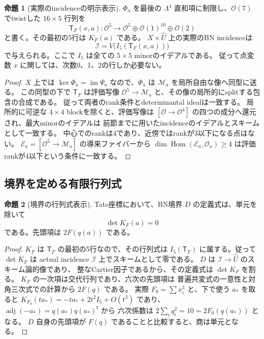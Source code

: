 \documentclass[a4paper,11pt]{ltjsarticle}
\theoremstyle{definition}
\newtheorem{theorem}{命題}[section]
\newtheorem{proposition}[theorem]{命題}
\newcommand{\OO}{\mathcal O}
\begin{document}
\begin{proposition}[実際のincidenceの明示表示]\label{prop:tate-actual-incidence}
$\Phi_a$ を最後の $\Lambda^4$ 直和項に制限し、$\OO(7)$ でtwistした
$16\times5$ 行列を
\[
 \mathsf T_F(x,a):\OO^5\longrightarrow
 \OO^5\oplus\OO(1)^{10}\oplus\OO(2)
\]
と書く。その最初の5行は $K_F(a)$ である。
$X\times\widehat U$ 上の実際のBN incidenceは
\[
              \mathcal I=V\bigl(I_5(\mathsf T_F(x,a))\bigr)
 \tag{T7a}\label{eq:tate-actual-incidence}
\]
で与えられる。ここで $I_5$ は全ての $5\times5$ minorのイデアルである。
従って点変数 $x$ に関しては、次数0、1、2の行しか必要ない。
\end{proposition}

\begin{proof}
$X$ 上では $\ker\Phi_a=\operatorname{im}\Psi_a$ なので、$\Phi_a$ は
$\mathcal M_a$ を局所自由な像へ同型に送る。
この同型の下で $\mathsf T_F$ は評価写像
$\OO^5\to\mathcal M_a$ と、その像の局所的にsplitする包含の合成である。
従って両者のrank条件とdeterminantal idealは一致する。
局所的に可逆な $4\times4$ blockを除くと、評価写像は
$[\OO\to\OO^4]$ の四つの成分へ還元され、最大minorのイデアルは
前節までに用いたincidenceのイデアルとスキームとして一致する。
中心でのrankは4であり、近傍ではrankが3以下になる点はない。
$\mathcal E_a=[\OO^5\to\mathcal M_a]$ の導来ファイバーから
$\dim\operatorname{Hom}(\mathcal E_a,\OO_x)\ge4$ は評価rankが4以下という条件に一致する。
\end{proof}

\subsection{境界を定める有限行列式}

\begin{theorem}[境界の行列式表示]\label{thm:tate-boundary-determinant}
Tate座標において、BN境界 $D$ の定義式は、単元を除いて
\[
                         \det K_F(a)=0
 \tag{T8}\label{eq:tate-boundary-determinant}
\]
である。先頭項は $2F(q(a))$ である。
\end{theorem}

\begin{proof}
$K_F$ は $\mathsf T_F$ の最初の5行なので、その行列式は
$I_5(\mathsf T_F)$ に属する。従って $\det K_F$ は actual incidence
$\mathcal I$ 上でスキームとして零である。
$D$ は $\mathcal I\to\widehat U$ のスキーム論的像であり、
整なCartier因子であるから、その定義式は $\det K_F$ を割る。
$K_F$ の一次項は交代行列であり、六次の先頭項は
普遍共変式の一意性と対角三次式での計算から $2F(q)$ である。
実際 $F_0=\sum x_i^3$ と、下で使う $a_*$ を取ると
$K_{F_0}(ta_*)=-ta_*+2t^2I_5+O(t^3)$ であり、
$\operatorname{adj}(-a_*)=q(a_*)q(a_*)^{\mathsf t}$ から
六次係数は $2\sum_i q_i^2=10=2F_0(q(a_*))$ となる。
$D$ 自身の先頭項が $F(q)$ であることと比較すると、商は単元となる。
\end{proof}
\end{document}
